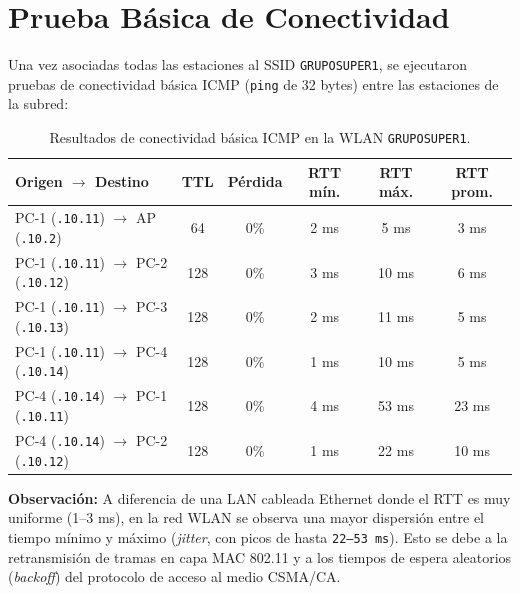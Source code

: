 \documentclass[11pt, a4paper]{article}
\begin{document}
\section{Prueba Básica de Conectividad}

Una vez asociadas todas las estaciones al SSID \texttt{GRUPOSUPER1}, se ejecutaron pruebas de conectividad básica ICMP (\texttt{ping} de 32 bytes) entre las estaciones de la subred:

\begin{table}[h!]
\centering
\small
\setlength{\tabcolsep}{4pt}
\caption{Resultados de conectividad básica ICMP en la WLAN \texttt{GRUPOSUPER1}.}
\begin{tabularx}{\textwidth}{>{\raggedright\arraybackslash}X c c c c c}
\toprule
\textbf{Origen $\rightarrow$ Destino} & \textbf{TTL} & \textbf{Pérdida} & \textbf{RTT mín.} & \textbf{RTT máx.} & \textbf{RTT prom.} \\
\midrule
PC-1 (\texttt{.10.11}) $\rightarrow$ AP (\texttt{.10.2}) & 64 & 0\% & 2 ms & 5 ms & 3 ms \\
PC-1 (\texttt{.10.11}) $\rightarrow$ PC-2 (\texttt{.10.12}) & 128 & 0\% & 3 ms & 10 ms & 6 ms \\
PC-1 (\texttt{.10.11}) $\rightarrow$ PC-3 (\texttt{.10.13}) & 128 & 0\% & 2 ms & 11 ms & 5 ms \\
PC-1 (\texttt{.10.11}) $\rightarrow$ PC-4 (\texttt{.10.14}) & 128 & 0\% & 1 ms & 10 ms & 5 ms \\
PC-4 (\texttt{.10.14}) $\rightarrow$ PC-1 (\texttt{.10.11}) & 128 & 0\% & 4 ms & 53 ms & 23 ms \\
PC-4 (\texttt{.10.14}) $\rightarrow$ PC-2 (\texttt{.10.12}) & 128 & 0\% & 1 ms & 22 ms & 10 ms \\
\bottomrule
\end{tabularx}
\end{table}

\noindent \textbf{Observación:} A diferencia de una LAN cableada Ethernet donde el RTT es muy uniforme (1--3 ms), en la red WLAN se observa una mayor dispersión entre el tiempo mínimo y máximo (\textit{jitter}, con picos de hasta \texttt{22--53 ms}). Esto se debe a la retransmisión de tramas en capa MAC 802.11 y a los tiempos de espera aleatorios (\textit{backoff}) del protocolo de acceso al medio CSMA/CA.

\end{document}
